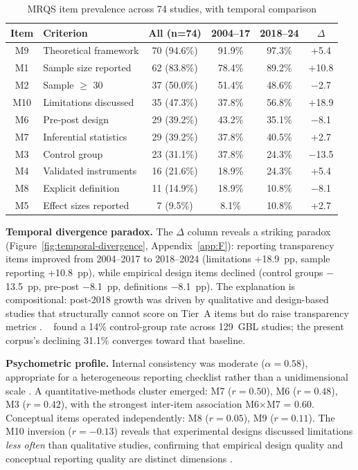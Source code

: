 \begin{table}[!h]
\centering
\caption{MRQS item prevalence across 74 studies, with temporal comparison}
\label{tab:mrqs-prevalence}
\small
\begin{tabular}{clcccc}
\hline
\textbf{Item} & \textbf{Criterion} & \textbf{All (n=74)} & \textbf{2004--17} & \textbf{2018--24} & \textbf{$\Delta$} \\
\hline
M9 & Theoretical framework & 70 (94.6\%) & 91.9\% & 97.3\% & +5.4 \\
M1 & Sample size reported & 62 (83.8\%) & 78.4\% & 89.2\% & +10.8 \\
M2 & Sample $\geq$ 30 & 37 (50.0\%) & 51.4\% & 48.6\% & $-$2.7 \\
M10 & Limitations discussed & 35 (47.3\%) & 37.8\% & 56.8\% & +18.9 \\
M6 & Pre-post design & 29 (39.2\%) & 43.2\% & 35.1\% & $-$8.1 \\
M7 & Inferential statistics & 29 (39.2\%) & 37.8\% & 40.5\% & +2.7 \\
M3 & Control group & 23 (31.1\%) & 37.8\% & 24.3\% & $-$13.5 \\
M4 & Validated instruments & 16 (21.6\%) & 18.9\% & 24.3\% & +5.4 \\
M8 & Explicit definition & 11 (14.9\%) & 18.9\% & 10.8\% & $-$8.1 \\
M5 & Effect sizes reported & 7 (9.5\%) & 8.1\% & 10.8\% & +2.7 \\
\hline
\end{tabular}
\end{table}

\textbf{Temporal divergence paradox.} \label{sec:temporal-divergence} The $\Delta$ column reveals a striking paradox (Figure~\ref{fig:temporal-divergence}, Appendix~\ref{app:F}): reporting transparency items improved from 2004--2017 to 2018--2024 (limitations +18.9~pp, sample reporting +10.8~pp), while empirical design items declined (control groups $-$13.5~pp, pre-post $-$8.1~pp, definitions $-$8.1~pp). The explanation is compositional: post-2018 growth was driven by qualitative and design-based studies that structurally cannot score on Tier~A items but do raise transparency metrics \cite{Korniienko2025mrqs}. \citeauthor{Connolly2012}~\cite{Connolly2012} found a 14\% control-group rate across 129~GBL studies; the present corpus's declining 31.1\% converges toward that baseline.

\textbf{Psychometric profile.} \label{sec:psychometric} Internal consistency was moderate ($\alpha = 0.58$), appropriate for a heterogeneous reporting checklist rather than a unidimensional scale \cite{Korniienko2025mrqs}. A quantitative-methods cluster emerged: M7 ($r = 0.50$), M6 ($r = 0.48$), M3 ($r = 0.42$), with the strongest inter-item association M6$\times$M7 = 0.60. Conceptual items operated independently: M8 ($r = 0.05$), M9 ($r = 0.11$). The M10 inversion ($r = -0.13$) reveals that experimental designs discussed limitations \emph{less often} than qualitative studies, confirming that empirical design quality and conceptual reporting quality are distinct dimensions \cite{DichevDicheva2017, Clark2016}.

